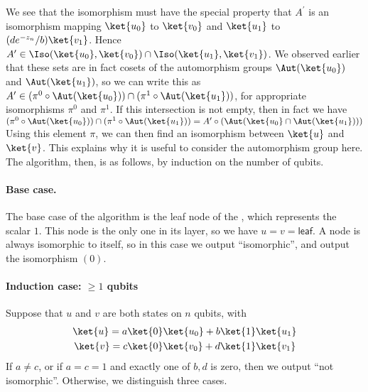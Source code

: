 We see that the isomorphism must have the special property that $A^\prime$ is an isomorphism mapping $\ket{u_0}$ to $\ket{v_0}$ and $\ket{u_1}$ to $(de^{-z_n}/b)\ket{v_1}$.
Hence $A^\prime\in\Iso(\ket{u_0},\ket{v_0})\cap \Iso(\ket{u_1},\ket{v_1})$.
We observed earlier that these sets are in fact cosets of the automorphism groups $\Aut(\ket{u_0})$ and $\Aut(\ket{u_1})$, so we can write this as $A^\prime\in (\pi^0\circ \Aut(\ket{u_0}))\cap (\pi^1\circ \Aut(\ket{u_1}))$, for appropriate isomorphisms $\pi^0$ and $\pi^1$.
If this intersection is not empty, then in fact we have $(\pi^0\circ\Aut(\ket{u_0}))\cap (\pi^1\circ\Aut(\ket{u_1}))=A^\prime\circ (\Aut(\ket{u_0}\cap\Aut(\ket{u_1})))$
Using this element $\pi$, we can then find an isomorphism between $\ket{u}$ and $\ket{v}$.
This explains why it is useful to consider the automorphism group here.
The algorithm, then, is as follows, by induction on the number of qubits.



\paragraph{Base case.} The base case of the algorithm is the \textsf{leaf} node of the \textsf{\limdd}, which represents the scalar $1$.
This node is the only one in its layer, so we have $u=v=\textsf{leaf}$.
A node is always isomorphic to itself, so in this case we output ``isomorphic'', and output the isomorphism $(0)$.

\paragraph{Induction case: $\geq 1$ qubits}
Suppose that $u$ and $v$ are both states on $n$ qubits, with
\begin{align}
\ket{u}=a&\ket{0}\ket{u_0}+b\ket{1}\ket{u_1} \\
\ket{v}=c&\ket{0}\ket{v_0}+d\ket{1}\ket{v_1}
\end{align}
If $a\ne c$, or if $a=c=1$ and exactly one of $b,d$ is zero, then we output ``not isomorphic''.
Otherwise, we distinguish three cases.

